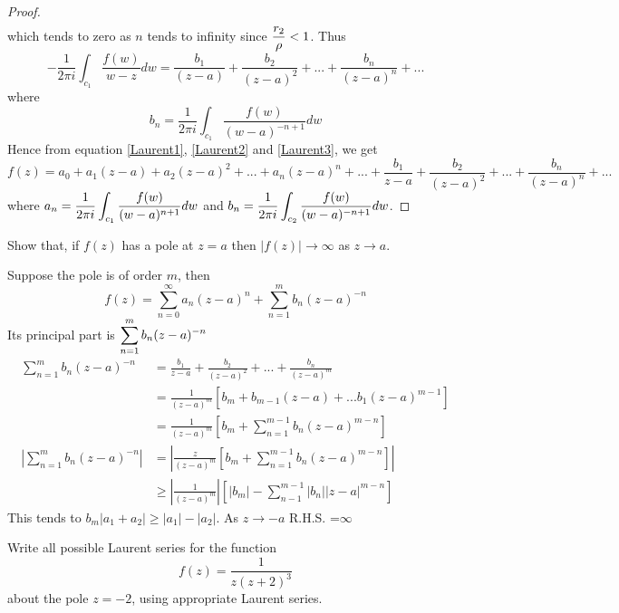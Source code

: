 \begin{proof}
\begin{align*}
\end{align*}
 which tends to zero as $n$ tends to infinity since $\displaystyle \frac{r_2}{\rho} < 1$. Thus
\begin{equation}\label{Laurent3}
	-\frac{1}{2\pi i}\int_{c_1} \frac{f(w)}{w-z}dw =  \frac{b_1}{(z-a)} + \frac{b_2}{(z-a)^2} + ... + \frac{b_n}{(z-a)^n} + ...
\end{equation}
where 
\[	b_n = \frac{1}{2\pi i} \int_{c_1}\frac{f(w)}{(w-a)^{-n+1}} dw \]
Hence from equation \ref{Laurent1}, \ref{Laurent2} and \ref{Laurent3}, we get
\[f(z) = a_0 + a_1(z-a) + a_2(z-a)^2 + ... + a_n(z-a)^n + ... + \frac{b_1}{z-a} + \frac{b_2}{(z-a)^2} + ... + \frac{b_n}{(z-a)^n} + ...\]
where $\displaystyle a_n = \frac{1}{2\pi i} \int_{c_1}\frac{f(w)}{(w-a)^{n+1}} dw$ and $\displaystyle 	b_n = \frac{1}{2\pi i} \int_{c_2}\frac{f(w)}{(w-a)^{-n+1}} dw$.
\end{proof}
\begin{example}
Show that, if $f(z)$ has a pole at $z=a$ then $|f(z)| \rightarrow \infty$ as $z \rightarrow a$.
\end{example}
\begin{solution}
Suppose the pole is of order $m$, then \[f(z)=\sum_{n=0}^{\infty}a_{n}(z-a)^{n}+\sum_{n=1}^{m}b_{n}(z-a)^{-n}\]
Its principal part is $\displaystyle \sum_{n=1}^{m}b_{n}(z-a)^{-n}$
\begin{align*}
\sum_{n=1}^{m} b_{n}(z-a)^{-n} & = \frac{b_{1}}{z-a}+\frac{b_{2}}{(z-a)^{2}}+...+\frac{b_{n}}{(z-a)^{m}} \\
&=\frac{1}{(z-a)^{m}}[b_{m}+b_{m-1}(z-a)+...b_{1}(z-a)^{m-1}] \\
&=\frac{1}{(z-a)^{m}}[b_{m}+\sum_{n=1}^{m-1}b_{n}(z-a)^{m-n}] \\
|\sum_{n=1}^{m}b_{n}(z-a)^{-n}| &= |\frac{z}{(z-a)^{m}}[b_{m}+\sum_{n=1}^{m-1}b_{n}(z-a)^{m-n}]| \\
& \geq |\frac{1}{(z-a)^{m}}| \left[|b_{m}|-\sum_{n-1}^{m-1}|b_{n}||z-a|^{m-n}\right]
\end{align*}
This tends to $b_{m}|a_{1}+a_{2}|\geq|a_{1}|-|a_{2}|$. As $z\rightarrow -a$ R.H.S. =$\infty$
\end{solution}
\begin{example}
Write all possible Laurent series for the function
\[f(z) = \frac{1}{z(z+2)^3}\]
about the pole $z=-2$, using appropriate Laurent series.
\end{example}
